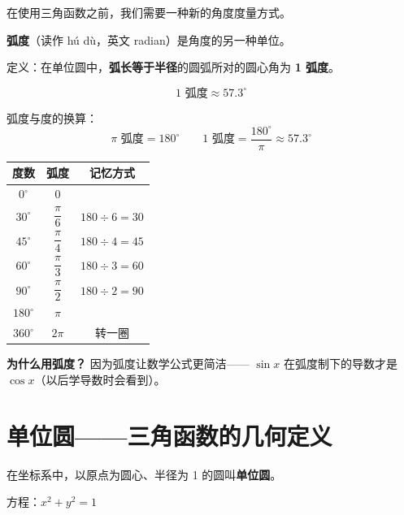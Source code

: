 在使用三角函数之前，我们需要一种新的角度度量方式。

\begin{definitionbox}[弧度制]
\textbf{弧度}（读作 hú dù，英文 radian）是角度的另一种单位。

定义：在单位圆中，\textbf{弧长等于半径}的圆弧所对的圆心角为 \textbf{1 弧度}。

\[
1 \text{ 弧度} \approx 57.3^\circ
\]

弧度与度的换算：
\[
\pi \text{ 弧度} = 180^\circ \qquad
1 \text{ 弧度} = \frac{180^\circ}{\pi} \approx 57.3^\circ
\]
\end{definitionbox}

\begin{examplebox}[1——常见角的弧度与度数]
\begin{center}
\begin{tabular}{c|c|c}
\textbf{度数} & \textbf{弧度} & \textbf{记忆方式} \\
\hline
\(0^\circ\) & \(0\) & \\
\(30^\circ\) & \(\dfrac{\pi}{6}\) & \(180\div6 = 30\) \\
\(45^\circ\) & \(\dfrac{\pi}{4}\) & \(180\div4 = 45\) \\
\(60^\circ\) & \(\dfrac{\pi}{3}\) & \(180\div3 = 60\) \\
\(90^\circ\) & \(\dfrac{\pi}{2}\) & \(180\div2 = 90\) \\
\(180^\circ\) & \(\pi\) & \\
\(360^\circ\) & \(2\pi\) & 转一圈 \\
\end{tabular}
\end{center}

\textbf{为什么用弧度？} 因为弧度让数学公式更简洁——
\( \sin x \) 在弧度制下的导数才是 \( \cos x \)（以后学导数时会看到）。
\end{examplebox}


\section{单位圆——三角函数的几何定义}

\begin{definitionbox}[单位圆]
在坐标系中，以原点为圆心、半径为 1 的圆叫\textbf{单位圆}。

方程：\(x^2 + y^2 = 1\)
\end{definitionbox}

